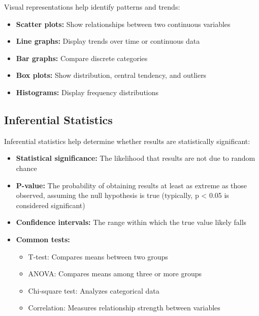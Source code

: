 Visual representations help identify patterns and trends:

\begin{itemize}
    \item \textbf{Scatter plots:} Show relationships between two continuous variables
    \item \textbf{Line graphs:} Display trends over time or continuous data
    \item \textbf{Bar graphs:} Compare discrete categories
    \item \textbf{Box plots:} Show distribution, central tendency, and outliers
    \item \textbf{Histograms:} Display frequency distributions
\end{itemize}

    \centering

\subsection{Inferential Statistics}

Inferential statistics help determine whether results are statistically significant:

\begin{itemize}
    \item \textbf{Statistical significance:} The likelihood that results are not due to random chance
    
    \item \textbf{P-value:} The probability of obtaining results at least as extreme as those observed, assuming the null hypothesis is true (typically, p < 0.05 is considered significant)
    
    \item \textbf{Confidence intervals:} The range within which the true value likely falls
    
    \item \textbf{Common tests:}
    \begin{itemize}
        \item T-test: Compares means between two groups
        \item ANOVA: Compares means among three or more groups
        \item Chi-square test: Analyzes categorical data
        \item Correlation: Measures relationship strength between variables
    \end{itemize}
\end{itemize}

